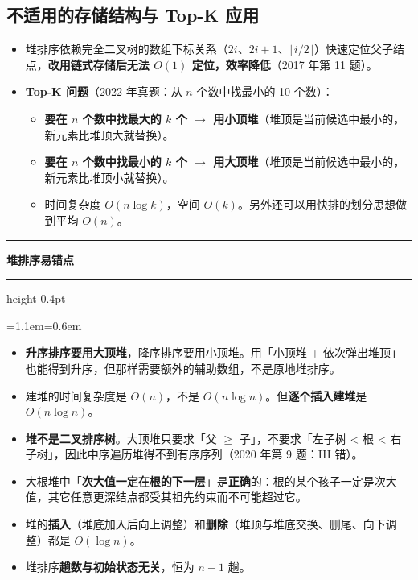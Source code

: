 \documentclass[11pt,openany,UTF8]{ctexbook}
\newcommand{\callouthead}[2]{%
  \par\addvspace{7pt}\noindent
  {\color{#1}\rule[-0.15em]{3pt}{1.05em}}\hspace{0.5em}%
  {\bfseries\color{#1}#2}\par\nobreak\vspace{-0.35em}%
  {\color{rulesep}\hrule height 0.4pt}\nobreak\vspace{0.45em}%
  \begingroup\small\setlength{\parindent}{0pt}%
  \leftskip=1.1em\rightskip=0.6em\noindent\ignorespaces}
\newcommand{\calloutend}{\par\endgroup\addvspace{7pt}}
\newenvironment{callwarn}[1]{\callouthead{warnbar}{#1}}{\calloutend}
\begin{document}
\subsection{不适用的存储结构与 Top-K 应用}

\begin{itemize}
\item 堆排序依赖完全二叉树的数组下标关系（$2i$、$2i+1$、$\lfloor i/2\rfloor$）快速定位父子结点，\textbf{改用链式存储后无法 $O(1)$ 定位，效率降低}（2017 年第 11 题）。
\item \textbf{Top-K 问题}（2022 年真题：从 $n$ 个数中找最小的 10 个数）：
\begin{itemize}
\item \textbf{要在 $n$ 个数中找最大的 $k$ 个 $\to$ 用小顶堆}（堆顶是当前候选中最小的，新元素比堆顶大就替换）。
\item \textbf{要在 $n$ 个数中找最小的 $k$ 个 $\to$ 用大顶堆}（堆顶是当前候选中最小的，新元素比堆顶小就替换）。
\item 时间复杂度 $O(n\log k)$，空间 $O(k)$。另外还可以用快排的划分思想做到平均 $O(n)$。
\end{itemize}
\end{itemize}
\begin{callwarn}{堆排序易错点}
\begin{itemize}
\item \textbf{升序排序要用大顶堆}，降序排序要用小顶堆。用「小顶堆 + 依次弹出堆顶」也能得到升序，但那样需要额外的辅助数组，不是原地堆排序。
\item 建堆的时间复杂度是 \textbf{$O(n)$}，不是 $O(n\log n)$。但\textbf{逐个插入建堆}是 $O(n\log n)$。
\item \textbf{堆不是二叉排序树}。大顶堆只要求「父 $\ge$ 子」，不要求「左子树 < 根 < 右子树」，因此中序遍历堆得不到有序序列（2020 年第 9 题：III 错）。
\item 大根堆中「\textbf{次大值一定在根的下一层}」是\textbf{正确}的：根的某个孩子一定是次大值，其它任意更深结点都受其祖先约束而不可能超过它。
\item 堆的\textbf{插入}（堆底加入后向上调整）和\textbf{删除}（堆顶与堆底交换、删尾、向下调整）都是 $O(\log n)$。
\item 堆排序\textbf{趟数与初始状态无关}，恒为 $n-1$ 趟。
\end{itemize}
\end{callwarn}
\end{document}

